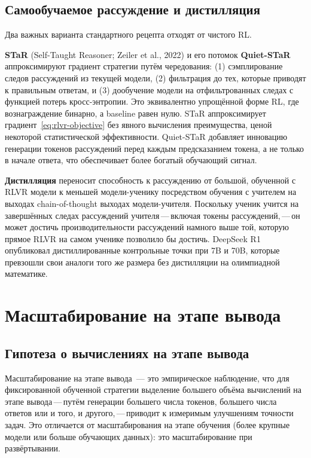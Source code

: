 \subsection{Самообучаемое рассуждение и дистилляция}
\label{subsec:star-distill}

Два важных варианта стандартного рецепта отходят от чистого RL.

\textbf{STaR} (Self-Taught Reasoner; Zeiler et al., 2022)
и его потомок \textbf{Quiet-STaR} аппроксимируют
градиент стратегии путём чередования: (1) сэмплирование следов рассуждений
из текущей модели, (2) фильтрация до тех, которые приводят к правильным
ответам, и (3) дообучение модели на отфильтрованных следах с
функцией потерь кросс-энтропии. Это эквивалентно упрощённой форме RL, где
вознаграждение бинарно, а baseline равен нулю. STaR аппроксимирует
градиент~\eqref{eq:rlvr-objective} без явного вычисления преимущества, ценой
некоторой статистической эффективности.
Quiet-STaR добавляет инновацию генерации токенов рассуждений перед
каждым предсказанием токена, а не только в начале ответа,
что обеспечивает более богатый обучающий сигнал.

\textbf{Дистилляция} переносит
способность к рассуждению от большой, обученной с RLVR модели к меньшей
модели-ученику посредством обучения с учителем на выходах
chain-of-thought выходах модели-учителя. Поскольку ученик учится на завершённых следах
рассуждений учителя\,---\,включая токены рассуждений,\,---\,он может
достичь производительности рассуждений намного выше той, которую прямое RLVR
на самом ученике позволило бы достичь. DeepSeek R1 опубликовал
дистиллированные контрольные точки при 7B и 70B, которые превзошли свои аналоги
того же размера без дистилляции на олимпиадной математике.

\section{Масштабирование на этапе вывода}
\label{sec:inference-scaling}

\subsection{Гипотеза о вычислениях на этапе вывода}

Масштабирование на этапе вывода~--- это
эмпирическое наблюдение, что для фиксированной обученной стратегии выделение большего
объёма вычислений на этапе вывода\,---\,путём генерации большего числа токенов, большего числа
ответов или и того, и другого,\,---\,приводит к измеримым улучшениям точности задач.
Это отличается от масштабирования на этапе обучения (более крупные модели
или больше обучающих данных): это масштабирование при развёртывании.

